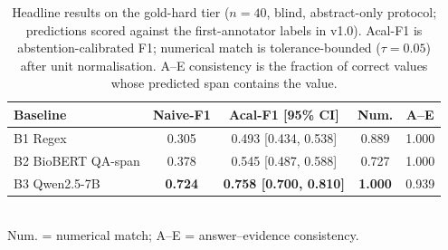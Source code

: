 \documentclass{article}
\begin{document}

\begin{table}[t]
\centering
\caption{Headline results on the gold-hard tier
($n=40$, blind, abstract-only protocol; predictions scored against
the first-annotator labels in v1.0). Acal-F1 is abstention-calibrated
F1; numerical match is tolerance-bounded ($\tau=0.05$) after unit
normalisation. A--E consistency is the fraction of correct values
whose predicted span contains the value.}
\label{tab:headline_results}
\small
\setlength{\tabcolsep}{3pt}
\begin{tabularx}{\columnwidth}{@{}Xcccc@{}}
\toprule
\textbf{Baseline} & \textbf{Naive-F1} & \textbf{Acal-F1 [95\% CI]} & \textbf{Num.} & \textbf{A--E} \\
\midrule
B1 Regex & 0.305 & 0.493 [0.434, 0.538] & 0.889 & 1.000 \\
B2 BioBERT QA-span & 0.378 & 0.545 [0.487, 0.588] & 0.727 & 1.000 \\
B3 Qwen2.5-7B & \textbf{0.724} & \textbf{0.758 [0.700, 0.810]} & \textbf{1.000} & 0.939 \\
\bottomrule
\end{tabularx}
\\[2pt]
{\footnotesize Num. = numerical match; A--E = answer--evidence consistency.}
\end{table}
\end{document}
